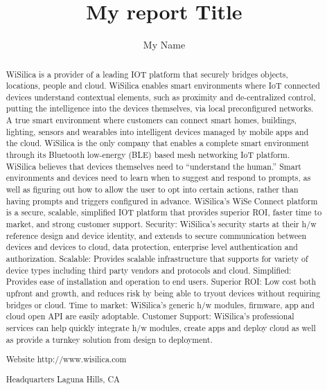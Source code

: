 \documentclass{fisattraining}
\title{My report Title}
\author{My Name}
\begin{document}
\maketitle
\makecert

\newpage
{}
\setcounter{page}{1}
\thispagestyle{plain}
\renewcommand\abstractname{Company Profile}
\begin{abstract}
\vspace{5cm}
WiSilica is a provider of a leading IOT platform that securely bridges objects, locations, people and cloud. WiSilica enables smart environments where IoT connected devices understand contextual elements, such as proximity and de-centralized control, putting the intelligence into the devices themselves, via local preconfigured networks. A true smart environment where customers can connect smart homes, buildings, lighting, sensors and wearables into intelligent devices managed by mobile apps and the cloud. WiSilica is the only company that enables a complete smart environment through its Bluetooth low-energy (BLE) based mesh networking IoT platform. WiSilica believes that devices themselves need to “understand the human.” Smart environments and devices need to learn when to suggest and respond to prompts, as well as figuring out how to allow the user to opt into certain actions, rather than having prompts and triggers configured in advance. WiSilica’s WiSe Connect platform is a secure, scalable, simplified IOT platform that provides superior ROI, faster time to market, and strong customer support. Security: WiSilica’s security starts at their h/w reference design and device identity, and extends to secure communication between devices and devices to cloud, data protection, enterprise level authentication and authorization. Scalable: Provides scalable infrastructure that supports for variety of device types including third party vendors and protocols and cloud. Simplified: Provides ease of installation and operation to end users. Superior ROI: Low cost both upfront and growth, and reduces risk by being able to tryout devices without requiring bridges or cloud. Time to market: WiSilica’s generic h/w modules, firmware, app and cloud open API are easily adoptable. Customer Support: WiSilica’s professional services can help quickly integrate h/w modules, create apps and deploy cloud as well as provide a turnkey solution from design to deployment.

Website
http://www.wisilica.com

Headquarters
Laguna Hills, CA


\end{abstract}
\end{document}
